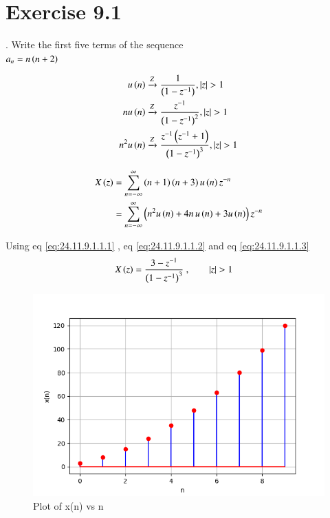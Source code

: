 \documentclass[journal,12pt,twocolumn]{IEEEtran}
\begin{document}


\vspace{3cm}

\title{}
\author{EE23BTECH11024 - G.Karthik Yadav$^{*}$
}
\maketitle
\newpage
\bigskip



\section*{Exercise 9.1}

. \hspace{2pt}Write the first five terms of the sequence\\
$a_n = n \left(n+2\right)$

\solution


\begin{align}
u\left(n\right) & \xrightarrow {Z} \frac{1}{\left(1-z^{-1}\right)} ,   \left\vert z\right\vert >1 \label{eq:24.11.9.1.1.1}\\
    n u\left(n\right) & \xrightarrow {Z} \frac{z^{-1}}{\left(1-z^{-1}\right)^2} ,   \left\vert z\right\vert >1 \label{eq:24.11.9.1.1.2}\\
    n^2 u\left(n\right) & \xrightarrow{Z} \frac{z^{-1}\left(z^{-1}+1\right)}{\left(1-z^{-1}\right)^3} ,  \left\vert z\right\vert > 1\label{eq:24.11.9.1.1.3}
\end{align} 


\begin{align}
    X \left(z\right) & = \sum_{n=-\infty}^{\infty}  \left(n+1\right)\left(n+3\right) u \left(n\right)   z^{-n} \\
    & = \sum_{n=-\infty}^{\infty}  \left(n^{2}u\left(n\right) + 4 n\, u\left(n\right)  + 3u\left(n\right) \right) z^{-n}
\end{align}    

Using eq \eqref{eq:24.11.9.1.1.1} , eq \eqref{eq:24.11.9.1.1.2} and eq \eqref{eq:24.11.9.1.1.3}
\begin{align}
     X \left(z\right) & = \frac{ 3-z^{-1}}{\left(1-z^{-1}\right)^3} \text{ ,}\qquad \left\vert z\right\vert>1
\end{align}

\begin{figure}[ht]
   \centering
   \includegraphics[width=1\columnwidth]{figs/plot1.png}
   \caption{Plot of x(n) vs n}
   \label{fig: 1.11.9.1.1}
\end{figure}
\end{document}
